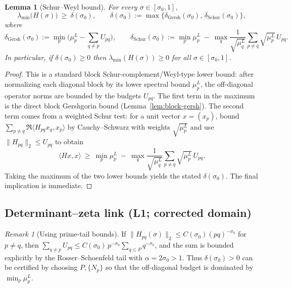 \documentclass[11pt]{article}
\newtheorem{lemma}[theorem]{Lemma}
\theoremstyle{definition}
\theoremstyle{remark}
\newtheorem{remark}[theorem]{Remark}
\theoremstyle{definition}
\begin{document}
\begin{lemma}[Schur--Weyl bound]\label{lem:schur-weyl-gap}
For every $\sigma\in[\sigma_0,1]$,
\[
  \lambda_{\min}\big(H(\sigma)\big)\ \ge\ \delta(\sigma_0),\qquad
  \delta(\sigma_0):=\max\big\{\delta_{\mathrm{Gersh}}(\sigma_0),\,\delta_{\mathrm{Schur}}(\sigma_0)\big\},
\]
where
\[
  \delta_{\mathrm{Gersh}}(\sigma_0):=\min_p\Big(\mu_p^L-\sum_{q\ne p}U_{pq}\Big),\qquad
  \delta_{\mathrm{Schur}}(\sigma_0):=\min_p \mu_p^L\ -\ \max_q\frac{1}{\sqrt{\mu_q^L}}\sum_{p\ne q}\sqrt{\mu_p^L}\,U_{pq}.
\]
In particular, if $\delta(\sigma_0)\ge 0$ then $\lambda_{\min}(H(\sigma))\ge 0$ for all $\sigma\in[\sigma_0,1]$.
\end{lemma}
\begin{proof}
This is a standard block Schur-complement/Weyl-type lower bound: after normalizing each diagonal block by its lower spectral bound $\mu_p^L$, the off-diagonal operator norms are bounded by the budgets $U_{pq}$. The first term in the maximum is the direct block Gershgorin bound (Lemma~\ref{lem:block-gersh}). The second term comes from a weighted Schur test: for a unit vector $x=(x_p)$, bound $\sum_{p\neq q}\Re\langle H_{pq}x_q,x_p\rangle$ by Cauchy–Schwarz with weights $\sqrt{\mu_p^L}$ and use $\|H_{pq}\|_2\le U_{pq}$ to obtain
\[
  \langle Hx,x\rangle \ \ge\ \min_p \mu_p^L\ -\ \max_q\frac{1}{\sqrt{\mu_q^L}}\sum_{p\ne q}\sqrt{\mu_p^L}\,U_{pq}.
\]
Taking the maximum of the two lower bounds yields the stated $\delta(\sigma_0)$. The final implication is immediate.
\end{proof}
\subsection*{Determinant--zeta link (L1; corrected domain)}

\begin{remark}[Using prime-tail bounds]
If $\|H_{pq}(\sigma)\|_2\le C(\sigma_0)(pq)^{-\sigma_0}$ for $p\ne q$, then $\sum_{q\ne p}U_{pq}\le C(\sigma_0)\,p^{-\sigma_0}\sum_{q\le P} q^{-\sigma_0}$, and the sum is bounded explicitly by the Rosser--Schoenfeld tail with $\alpha=2\sigma_0>1$. Thus $\delta(\sigma_0)>0$ can be certified by choosing $P,\{N_p\}$ so that the off-diagonal budget is dominated by $\min_p\mu_p^L$.
\end{remark}
\end{document}
